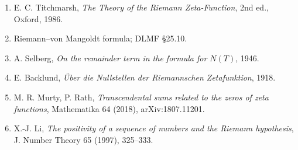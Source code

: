 \documentclass[
]{article}
\providecommand{\tightlist}{%
  \setlength{\itemsep}{0pt}\setlength{\parskip}{0pt}}
\begin{document}
\begin{enumerate}
\def\labelenumi{\arabic{enumi}.}
\tightlist
\item
  E. C. Titchmarsh, \emph{The Theory of the Riemann Zeta-Function}, 2nd
  ed., Oxford, 1986.
\item
  Riemann--von Mangoldt formula; DLMF §25.10.
\item
  A. Selberg, \emph{On the remainder term in the formula for \(N(T)\)},
  1946.
\item
  E. Backlund, \emph{Über die Nullstellen der Riemannschen
  Zetafunktion}, 1918.
\item
  M. R. Murty, P. Rath, \emph{Transcendental sums related to the zeros
  of zeta functions}, Mathematika 64 (2018), arXiv:1807.11201.
\item
  X.-J. Li, \emph{The positivity of a sequence of numbers and the
  Riemann hypothesis}, J. Number Theory 65 (1997), 325--333.
\end{enumerate}
\end{document}
